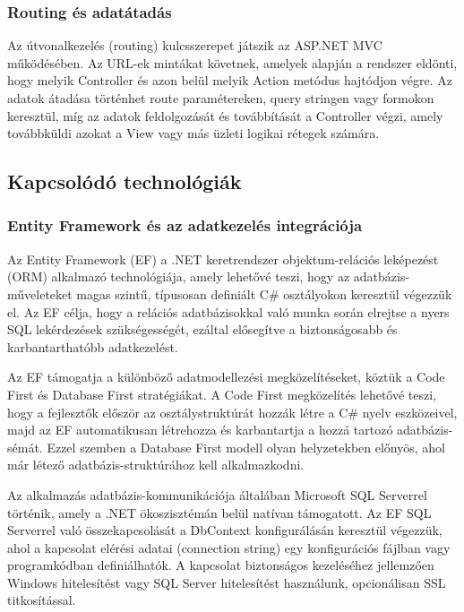 \subsubsection{Routing és adatátadás}

\indent Az útvonalkezelés (routing) kulcsszerepet játszik az ASP.NET MVC működésében. Az URL-ek mintákat követnek, amelyek alapján a rendszer eldönti, hogy melyik Controller és azon belül melyik Action metódus hajtódjon végre. Az adatok átadása történhet route paramétereken, query stringen vagy formokon keresztül, míg az adatok feldolgozását és továbbítását a Controller végzi, amely továbbküldi azokat a View vagy más üzleti logikai rétegek számára.

\subsection{Kapcsolódó technológiák}

\subsubsection{Entity Framework és az adatkezelés integrációja}

\indent Az Entity Framework (EF) a .NET keretrendszer objektum-relációs leképezést (ORM) alkalmazó technológiája, amely lehetővé teszi, hogy az adatbázis-műveleteket magas szintű, típusosan definiált C\# osztályokon keresztül végezzük el. Az EF célja, hogy a relációs adatbázisokkal való munka során elrejtse a nyers SQL lekérdezések szükségességét, ezáltal elősegítve a biztonságosabb és karbantarthatóbb adatkezelést.

Az EF támogatja a különböző adatmodellezési megközelítéseket, köztük a Code First és Database First stratégiákat. A Code First megközelítés lehetővé teszi, hogy a fejlesztők először az osztálystruktúrát hozzák létre a C\# nyelv eszközeivel, majd az EF automatikusan létrehozza és karbantartja a hozzá tartozó adatbázis-sémát. Ezzel szemben a Database First modell olyan helyzetekben előnyös, ahol már létező adatbázis-struktúrához kell alkalmazkodni.

Az alkalmazás adatbázis-kommunikációja általában Microsoft SQL Serverrel történik, amely a .NET ökoszisztémán belül natívan támogatott. Az EF SQL Serverrel való összekapcsolását a DbContext konfigurálásán keresztül végezzük, ahol a kapcsolat elérési adatai (connection string) egy konfigurációs fájlban vagy programkódban definiálhatók. A kapcsolat biztonságos kezeléséhez jellemzően Windows hitelesítést vagy SQL Server hitelesítést használunk, opcionálisan SSL titkosítással.

